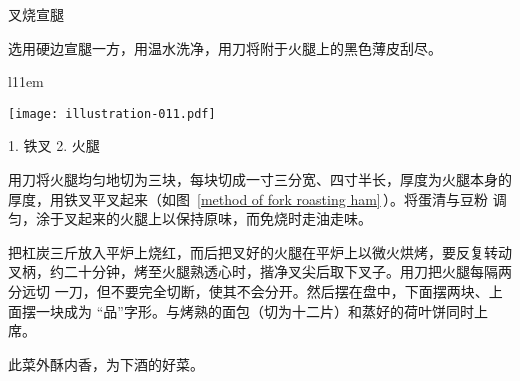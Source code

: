 \begin{recipe}{叉烧宣腿}

\ingredients


\preparation

\step 选用硬边宣腿一方，用温水洗净，用刀将附于火腿上的黑色薄皮刮尽。

\begin{wrapfigure}[13]{l}{11em}%
\begin{center}%
\vspace{-1.75\baselineskip}%
\texttt{[image: illustration-011.pdf]}%
\vspace{-.4375\baselineskip}%
\caption{叉烧宣腿叉法}
\label{method of fork roasting ham}%
\begingroup%
\small%
\noindent%
\null\hspace{0em}1. 铁叉 2. 火腿
\endgroup%
\end{center}%
\end{wrapfigure}

\step 用刀将火腿均匀地切为三块，每块切成一寸三分宽、四寸半长，厚度为火腿本身的
厚度，用铁叉平叉起来（如图~\ref{method of fork roasting ham}\,）。将蛋清与豆粉
调匀，涂于叉起来的火腿上以保持原味，而免烧时走油走味。

\step 把杠炭三斤放入平炉上烧红，而后把叉好的火腿在平炉上以微火烘烤，要反复转动
叉柄，约二十分钟，烤至火腿熟透心时，揩净叉尖后取下叉子。用刀把火腿每隔两分远切
一刀，但不要完全切断，使其不会分开。然后摆在盘中，下面摆两块、上面摆一块成为
“品”字形。与烤熟的面包（切为十二片）和蒸好的荷叶饼同时上席。

\features

此菜外酥内香，为下酒的好菜。

\end{recipe}

